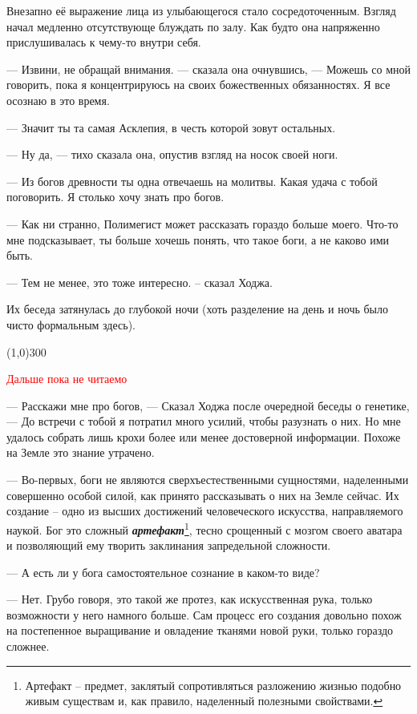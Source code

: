 \documentclass[12pt,a4paper]{article}
\newcommand{\tr}[1]{\textcolor{red}{#1}}
\newcommand{\sep}{
	\begin{center}
		\line(1,0){300}
	\end{center}
}
\begin{document}
Внезапно её выражение лица из улыбающегося стало сосредоточенным. Взгляд начал медленно отсутствующе блуждать по залу. Как будто она напряженно прислушивалась к чему-то внутри себя.

--- Извини, не обращай внимания. --- сказала она очнувшись, --- Можешь со мной говорить, пока я концентрируюсь на своих божественных обязанностях. Я все осознаю в это время.

--- Значит ты та самая Асклепия, в честь которой зовут остальных.

--- Ну да, --- тихо сказала она, опустив взгляд на носок своей ноги.

--- Из богов древности ты одна отвечаешь на молитвы. Какая удача с тобой поговорить. Я столько хочу знать про богов.

--- Как ни странно, Полимегист может рассказать гораздо больше моего. Что-то мне подсказывает, ты больше хочешь понять, что такое боги, а не каково ими быть.

--- Тем не менее, это тоже интересно. -- сказал Ходжа.

Их беседа затянулась до глубокой ночи (хоть разделение на день и ночь было чисто формальным здесь).


\sep


\tr{\Large \center Дальше пока не читаемо}
\newpage

--- Расскажи мне про богов, --- Сказал Ходжа после очередной беседы о генетике, --- До встречи с тобой я потратил много усилий, чтобы разузнать о них. Но мне удалось собрать лишь крохи более или менее достоверной информации. Похоже на Земле это знание утрачено.

--- Во-первых, боги не являются сверхъестественными сущностями, наделенными совершенно особой силой, как принято рассказывать о них на Земле сейчас. Их создание -- одно из высших достижений человеческого искусства, направляемого наукой. Бог это сложный \textbf{\textit{артефакт}}\footnote{Артефакт --  предмет, заклятый сопротивляться разложению жизнью подобно живым существам и, как правило, наделенный полезными свойствами.}, тесно срощенный с мозгом своего аватара и позволяющий ему творить заклинания запредельной сложности.

--- А есть ли у бога самостоятельное сознание в каком-то виде?

--- Нет. Грубо говоря, это такой же протез, как искусственная рука, только возможности у него намного больше. Сам процесс его создания довольно похож на постепенное выращивание и овладение тканями новой руки, только гораздо сложнее.
\end{document}

